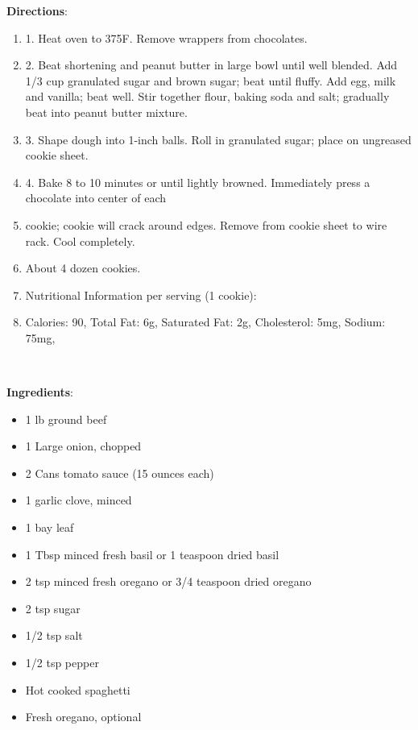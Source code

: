 \documentclass[11pt, twoside, openany]{book}
\begin{document}
\textbf{Directions}:
\vspace{-3mm}\begin{enumerate}\setlength\itemsep{-1mm}
\item 1. Heat oven to 375F. Remove wrappers from chocolates.
\item 2. Beat shortening and peanut butter in large bowl until well blended. Add 1/3 cup granulated sugar and brown sugar; beat until fluffy. Add egg, milk and vanilla; beat well. Stir together flour, baking soda and salt; gradually beat into peanut butter mixture.
\item 3. Shape dough into 1-inch balls. Roll in granulated sugar; place on ungreased cookie sheet.
\item 4. Bake 8 to 10 minutes or until lightly browned. Immediately press a chocolate into center of each
\item cookie; cookie will crack around edges. Remove from cookie sheet to wire rack. Cool completely.
\item About 4 dozen cookies.
\item Nutritional Information per serving (1 cookie):
\item Calories: 90, Total Fat: 6g, Saturated Fat: 2g, Cholesterol: 5mg, Sodium: 75mg,
\end{enumerate}
 \label{savory-spaghetti-sauce-recipe}\hfill\textit{}\\
\begin{minipage}[t]{0.8\linewidth}
\textbf{Ingredients}:\vspace{-3mm}
\begin{multicols}{2}
\begin{itemize}\setlength\itemsep{-1mm}
\item 1 lb ground beef
\item 1 Large onion, chopped
\item 2 Cans tomato sauce (15 ounces each)
\item 1 garlic clove, minced
\item 1 bay leaf
\item 1 Tbsp minced fresh basil or 1 teaspoon dried basil
\item 2 tsp minced fresh oregano or 3/4 teaspoon dried oregano
\item 2 tsp sugar
\item 1/2 tsp salt
\item 1/2 tsp pepper
\item Hot cooked spaghetti
\item Fresh oregano, optional
\end{itemize}
\end{multicols}
\end{minipage}
\end{document}
